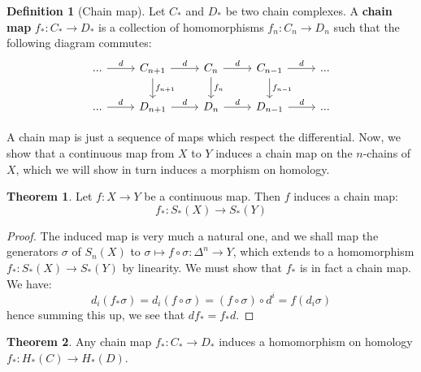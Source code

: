 \documentclass[12pt, oneside]{article}   	%
\theoremstyle{definition}
\newtheorem{definition}{Definition}[section]
\newtheorem{theorem}{Theorem}[section]
\begin{document}
\begin{definition}[Chain map]
	Let $C_*$ and $D_*$ be two chain complexes. A \textbf{chain map} $f_* : C_*\rightarrow D_*$ is a collection of 
	homomorphisms $f_n : C_n\rightarrow D_n$ such that the following diagram commutes:
	\begin{equation}\begin{tikzcd}
	...\arrow[r, "d"] & C_{n + 1}\arrow[d, "f_{n + 1}"]\arrow[r, "d"] & C_n\arrow[d, "f_n"]\arrow[r, "d"] & C_{n - 1}\arrow[d, 
	"f_{n - 1}"]\arrow[r, "d"] & ... \\
	...\arrow[r, "d"] & D_{n + 1}\arrow[r, "d"] & D_n\arrow[r, "d"] & D_{n - 1}\arrow[r, "d"] & ...
	\end{tikzcd}\end{equation}
\end{definition}

A chain map is just a sequence of maps which respect the differential. Now, we show that a continuous map from $X$ to $Y$ 
induces a chain map on the $n$-chains of $X$, which we will show in turn induces a morphism on homology. 

\begin{theorem}
	Let $f : X\rightarrow Y$ be a continuous map. Then $f$ induces a chain map:
	\begin{equation}
		f_* : S_*(X)\rightarrow S_*(Y)
	\end{equation}
\end{theorem}

\begin{proof}
	The induced map is very much a natural one, and we shall map the generators $\sigma$ of $S_n(X)$ to $\sigma\mapsto 
	f\circ\sigma : \Delta^n\rightarrow Y$, which extends to a homomorphism $f_* : S_*(X)\rightarrow S_*(Y)$ by linearity. We 
	must show that $f_*$ is in fact a chain map. We have:
	\begin{equation}
		d_i (f_*\sigma) = d_i (f\circ\sigma) = (f\circ\sigma)\circ d^i = f(d_i\sigma)
	\end{equation}
	hence summing this up, we see that $df_* = f_*d$. 
\end{proof}

\begin{theorem}
	Any chain map $f_* : C_*\rightarrow D_*$ induces a homomorphism on homology $f_* : H_*(C)\rightarrow H_*(D)$. 
\end{theorem}
\end{document}

